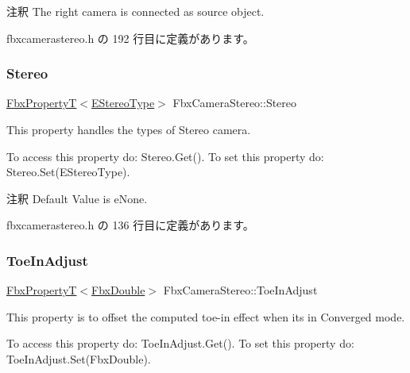 \begin{DoxyRemark}{注釈}
The right camera is connected as source object. 
\end{DoxyRemark}


 fbxcamerastereo.\+h の 192 行目に定義があります。

\mbox{\label{class_fbx_camera_stereo_af7ab718dda255c4673813f0993cd143f}} 
\subsubsection{\texorpdfstring{Stereo}{Stereo}}
{\footnotesize\ttfamily \hyperlink{class_fbx_property_t}{Fbx\+PropertyT}$<$\hyperlink{class_fbx_camera_stereo_acb0f27675a73de0858983b703196cb37}{E\+Stereo\+Type}$>$ Fbx\+Camera\+Stereo\+::\+Stereo}

This property handles the types of Stereo camera.

To access this property do\+: Stereo.\+Get(). To set this property do\+: Stereo.\+Set(\+E\+Stereo\+Type).

\begin{DoxyRemark}{注釈}
Default Value is e\+None. 
\end{DoxyRemark}


 fbxcamerastereo.\+h の 136 行目に定義があります。

\mbox{\label{class_fbx_camera_stereo_ad869c71fad3c11ada97b96bceeda09ed}} 
\subsubsection{\texorpdfstring{Toe\+In\+Adjust}{ToeInAdjust}}
{\footnotesize\ttfamily \hyperlink{class_fbx_property_t}{Fbx\+PropertyT}$<$\hyperlink{fbxtypes_8h_a171e72a1c46fc15c1a6c9c31948c1c5b}{Fbx\+Double}$>$ Fbx\+Camera\+Stereo\+::\+Toe\+In\+Adjust}

This property is to offset the computed toe-\/in effect when it\textquotesingle{}s in Converged mode.

To access this property do\+: Toe\+In\+Adjust.\+Get(). To set this property do\+: Toe\+In\+Adjust.\+Set(\+Fbx\+Double).

